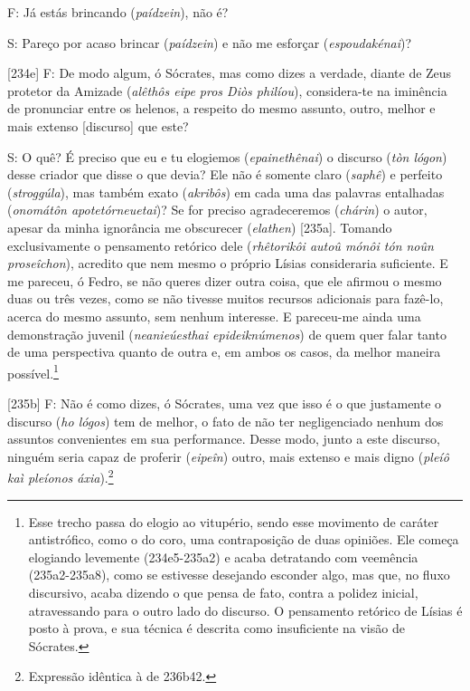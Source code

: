 F: Já estás brincando (\emph{paídzein}), não é?

S: Pareço por acaso brincar (\emph{paídzein}) e não me esforçar
(\emph{espoudakénai})?

{[}234e{]} F: De modo algum, ó Sócrates, mas como dizes a verdade,
diante de Zeus protetor da Amizade (\emph{alêthôs eipe pros Diòs
philíou}), considera-te na iminência de pronunciar entre os helenos, a
respeito do mesmo assunto, outro, melhor e mais extenso {[}discurso{]}
que este?

S: O quê? É preciso que eu e tu elogiemos (\emph{epainethênai}) o
discurso (\emph{tòn lógon}) desse criador que disse o que devia? Ele não
é somente claro (\emph{saphê}) e perfeito (\emph{stroggúla}), mas também
exato (\emph{akribôs}) em cada uma das palavras entalhadas
(\emph{onomátôn apotetórneuetai})? Se for preciso agradeceremos
(\emph{chárin}) o autor, apesar da minha ignorância me obscurecer
(\emph{elathen}) {[}235a{]}. Tomando exclusivamente o pensamento
retórico dele (\emph{rhêtorikôi autoû mónôi tón noûn proseîchon}),
acredito que nem mesmo o próprio Lísias consideraria suficiente. E me
pareceu, ó Fedro, se não queres dizer outra coisa, que ele afirmou o
mesmo duas ou três vezes, como se não tivesse muitos recursos adicionais
para fazê-lo, acerca do mesmo assunto, sem nenhum interesse. E
pareceu-me ainda uma demonstração juvenil (\emph{neanieúesthai
epideiknúmenos}) de quem quer falar tanto de uma perspectiva quanto de
outra e, em ambos os casos, da melhor maneira possível.\footnote{Esse
  trecho passa do elogio ao vitupério, sendo esse movimento de caráter
  antistrófico, como o do coro, uma contraposição de duas opiniões. Ele
  começa elogiando levemente (234e5-235a2) e acaba detratando com
  veemência (235a2-235a8), como se estivesse desejando esconder algo,
  mas que, no fluxo discursivo, acaba dizendo o que pensa de fato,
  contra a polidez inicial, atravessando para o outro lado do discurso.
  O pensamento retórico de Lísias é posto à prova, e sua técnica é
  descrita como insuficiente na visão de Sócrates.}

{[}235b{]} F: Não é como dizes, ó Sócrates, uma vez que isso é o que
justamente o discurso (\emph{ho lógos}) tem de melhor, o fato de não ter
negligenciado nenhum dos assuntos convenientes em sua performance. Desse
modo, junto a este discurso, ninguém seria capaz de proferir
(\emph{eipeîn}) outro, mais extenso e mais digno (\emph{pleíô kaì
pleíonos áxia}).\footnote{Expressão idêntica à de 236b42.}

